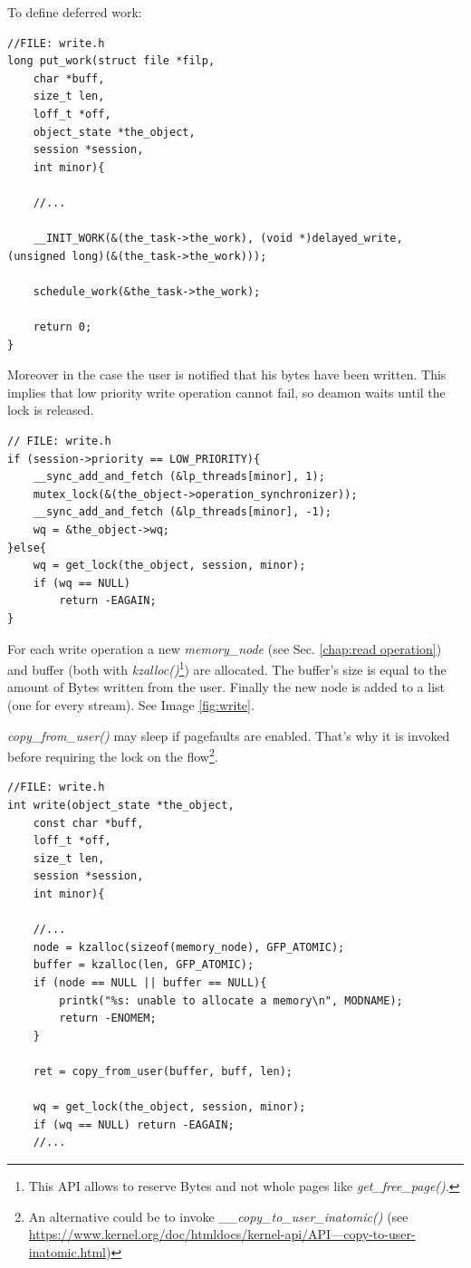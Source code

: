 \documentclass[12pt]{report}
\begin{document}
To define deferred work:

\begin{lstlisting}
//FILE: write.h
long put_work(struct file *filp,
	char *buff,
	size_t len,
	loff_t *off,
	object_state *the_object,
	session *session,
	int minor){
	
	//...
	
	__INIT_WORK(&(the_task->the_work), (void *)delayed_write, (unsigned long)(&(the_task->the_work)));
	
	schedule_work(&the_task->the_work);
	
	return 0;
}
\end{lstlisting}

Moreover in the case the user is notified that his bytes have been written. This implies that low priority write operation cannot fail, so deamon waits until the lock is released.

\begin{lstlisting}
// FILE: write.h 
if (session->priority == LOW_PRIORITY){
	__sync_add_and_fetch (&lp_threads[minor], 1);
	mutex_lock(&(the_object->operation_synchronizer));
	__sync_add_and_fetch (&lp_threads[minor], -1);
	wq = &the_object->wq;
}else{
	wq = get_lock(the_object, session, minor);
	if (wq == NULL)
		return -EAGAIN;
}
\end{lstlisting}

For each write operation a new \emph{memory\_node} (see Sec. \ref{chap:read operation}) and buffer (both with \emph{kzalloc()}\footnote{This API allows to reserve Bytes and not whole pages like \emph{get\_free\_page()}.}) are allocated. The buffer's size is equal to the amount of Bytes written from the user. Finally the new node is added to a list (one for every stream). See Image \ref{fig:write}.

\emph{copy\_from\_user()} may sleep if pagefaults are enabled. That's why it is invoked before requiring the lock on the flow\footnote{An alternative could be to invoke \emph{\_\_copy\_to\_user\_inatomic()} (see \href{https://www.kernel.org/doc/htmldocs/kernel-api/API---copy-to-user-inatomic.html}{https://www.kernel.org/doc/htmldocs/kernel-api/API---copy-to-user-inatomic.html})}.

\begin{lstlisting}
//FILE: write.h
int write(object_state *the_object,
	const char *buff,
	loff_t *off, 
	size_t len, 
	session *session,
	int minor){

	//...
	node = kzalloc(sizeof(memory_node), GFP_ATOMIC);
	buffer = kzalloc(len, GFP_ATOMIC);
	if (node == NULL || buffer == NULL){
		printk("%s: unable to allocate a memory\n", MODNAME);
		return -ENOMEM;
	}
	
	ret = copy_from_user(buffer, buff, len);
	
	wq = get_lock(the_object, session, minor);
	if (wq == NULL) return -EAGAIN;
	//...
\end{lstlisting}
\end{document}
